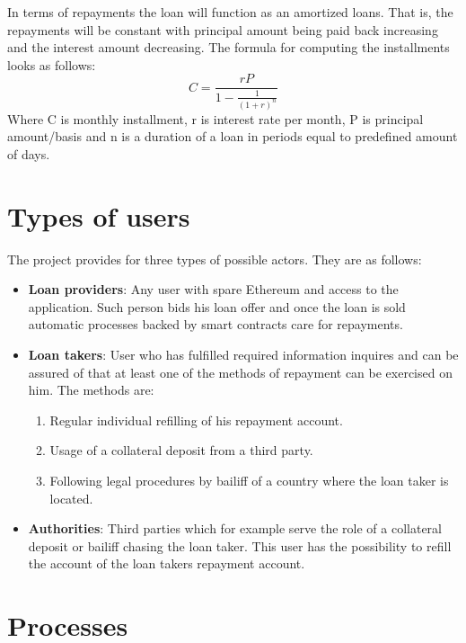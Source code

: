 \documentclass[a4paper,12pt,twoside,openany]{report}
\begin{document}
In terms of repayments the loan will function as an amortized loans. That is, the repayments will be constant with principal amount being paid back increasing and the interest amount decreasing. The formula for computing the installments looks as follows:
\[C = \frac{rP}{1 - \frac{1}{(1+r)^n}}\]
Where C is monthly installment, r is interest rate per month, P is principal amount/basis and n is a duration of a loan in periods equal to predefined amount of days.

\section{Types of users}

The project provides for three types of possible actors. They are as follows:
\begin{itemize}
\item \textbf{Loan providers}: Any user with spare Ethereum and access to the application. Such person bids his loan offer and once the loan is sold automatic processes backed by smart contracts care for repayments.
\item \textbf{Loan takers}: User who has fulfilled required information inquires and can be assured of that at least one of the methods of repayment can be exercised on him. The methods are:
\begin{enumerate}
\item Regular individual refilling of his repayment account.
\item Usage of a collateral deposit from a third party.
\item Following legal procedures by bailiff of a country where the loan taker is located.
\end{enumerate}
\item \textbf{Authorities}: Third parties which for example serve the role of a collateral deposit or bailiff chasing the loan taker. This user has the possibility to refill the account of the loan takers repayment account.
\end{itemize}


\section{Processes}
\end{document}
